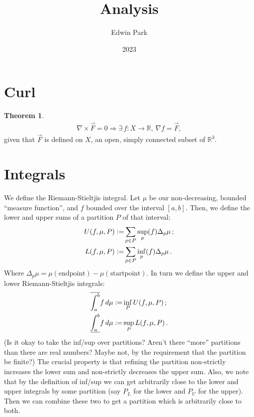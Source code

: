 \documentclass{article}
\title{Analysis}
\author{Edwin Park}
\date{2023}
\newcommand{\vc}{\vcentcolon}
\theoremstyle{definition}
\newtheorem{thm}{Theorem}[subsubsection]
\begin{document}
\clearpage\maketitle\thispagestyle{empty} %
\newpage
\tableofcontents
\newpage\setcounter{page}{1}

\section{Curl}
\begin{thm}
	\begin{align*}
		\nabla\times\vec F=0\Rightarrow\exists\,f:X\rightarrow \mathbb{R},\,\nabla f=\vec F,
	\end{align*}
	given that $\vec F$ is defined on $X$, an open, simply connected subset of $\mathbb{R}^3$.
\end{thm}

\newpage


\section{Integrals}
We define the Riemann-Stieltjis integral.
Let $\mu$ be our non-decreasing, bounded ``measure function'', and $f$ bounded over the interval $[a,b]$. Then, we define the lower and upper sums of a partition $P$ of that interval:
\begin{align*}
	U(f,\mu,P)\vc=&\sum_{p\in P}\sup_p(f)\Delta_p\mu\,;\\
	L(f,\mu,P)\vc=&\sum_{p\in P}\inf_p(f)\Delta_p\mu\,.
\end{align*}
Where $\Delta_p\mu=\mu(\text{endpoint})-\mu(\text{startpoint})$.
In turn we define the upper and lower Riemann-Stieltjis integrals:
\begin{align*}
	\overline{\int_a^b} f\,d\mu\vc=&\inf_PU(f,\mu,P)\,;\\
	\underline{\int_a^b} f\,d\mu\vc=&\sup_PL(f,\mu,P)\,.
\end{align*}
(Is it okay to take the inf/sup over partitions? Aren't there ``more'' partitions than there are real numbers? Maybe not, by the requirement that the partition be finite?)
The crucial property is that refining the partition non-strictly increases the lower sum and non-strictly decreases the upper sum. Also, we note that by the definition of inf/sup we can get arbitrarily close to the lower and upper integrals by some partition (say $P_L$ for the lower and $P_U$ for the upper). Then we can combine these two to get a partition which is arbitrarily close to both.
\end{document}
